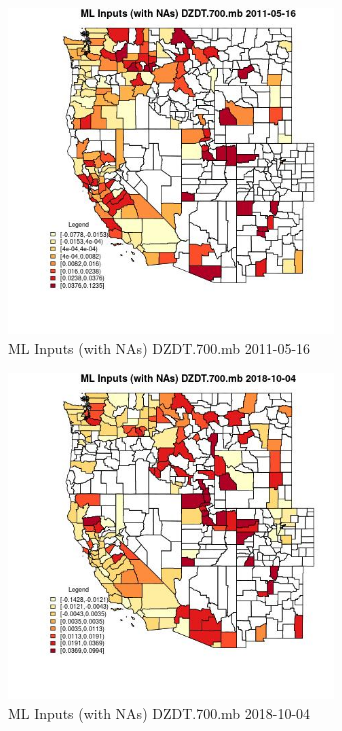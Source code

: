 \begin{figure} 
\centering  
\includegraphics[width=0.77\textwidth]{Code_Outputs/Report_ML_input_PM25_Step4_part_f_de_duplicated_aves_prioritize_24hr_obswNAs_CountyDZDT700mbMean2011-05-16.jpg} 
\caption{\label{fig:Report_ML_input_PM25_Step4_part_f_de_duplicated_aves_prioritize_24hr_obswNAsCountyDZDT700mbMean2011-05-16}ML Inputs (with NAs) DZDT.700.mb 2011-05-16} 
\end{figure} 
 

\begin{figure} 
\centering  
\includegraphics[width=0.77\textwidth]{Code_Outputs/Report_ML_input_PM25_Step4_part_f_de_duplicated_aves_prioritize_24hr_obswNAs_CountyDZDT700mbMean2018-10-04.jpg} 
\caption{\label{fig:Report_ML_input_PM25_Step4_part_f_de_duplicated_aves_prioritize_24hr_obswNAsCountyDZDT700mbMean2018-10-04}ML Inputs (with NAs) DZDT.700.mb 2018-10-04} 
\end{figure} 
 

